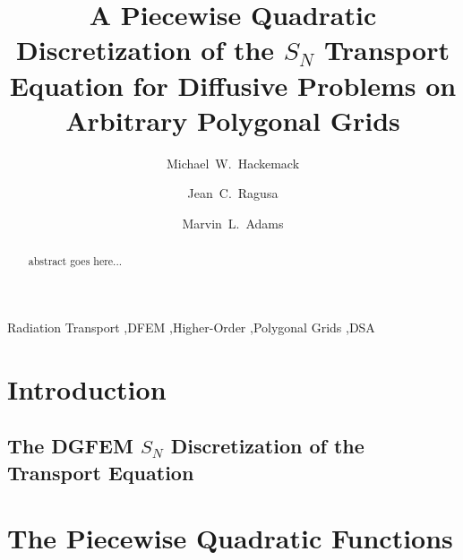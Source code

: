 \documentclass[preprint,review,10pt]{elsarticle}
\begin{document}
\begin{frontmatter}
\title{A Piecewise Quadratic Discretization of the $S_N$ Transport Equation for Diffusive Problems on Arbitrary Polygonal Grids}
\author[kapl]{Michael~W.~Hackemack}
\author[tamu]{Jean~C.~Ragusa}
\author[tamu]{Marvin~L.~Adams}
\address[kapl]{Knolls Atomic Power Laboratory, P.O. Box 1072, Schenectady, NY 12301}
\address[tamu]{Department of Nuclear Engineering, Texas A\&M University, College Station, TX 77843, USA}
\begin{abstract}
abstract goes here...
\end{abstract}
\begin{keyword}
Radiation Transport \sep DFEM \sep Higher-Order \sep Polygonal Grids \sep DSA 
\end{keyword}
\end{frontmatter}

\linenumbers

\section{Introduction} \label{sec::intro}


\subsection{The DGFEM $S_N$ Discretization of the Transport Equation} \label{sec::intro_trans}



\section{The Piecewise Quadratic Functions} \label{sec::PWQ}
\end{document}
